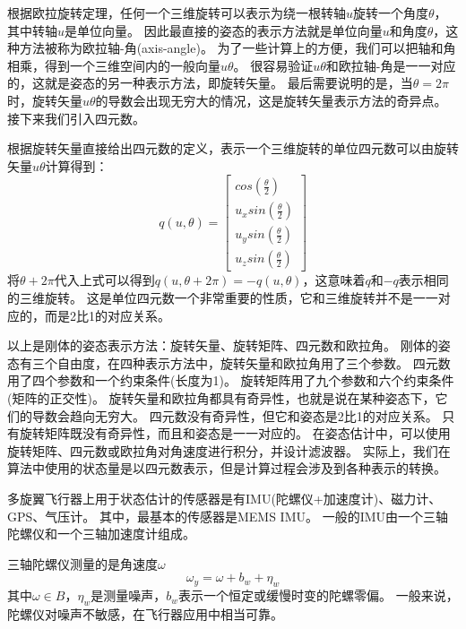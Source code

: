 \documentclass[
  type=master
]{gdutthesis}
\begin{document}
根据欧拉旋转定理，任何一个三维旋转可以表示为绕一根转轴$u$旋转一个角度$\theta$，其中转轴$u$是单位向量\cite{palais2007euler}。
因此最直接的姿态的表示方法就是单位向量$u$和角度$\theta$，这种方法被称为欧拉轴-角(axis-angle)。
为了一些计算上的方便，我们可以把轴和角相乘，得到一个三维空间内的一般向量$u\theta$。
很容易验证$u\theta$和欧拉轴-角是一一对应的，这就是姿态的另一种表示方法，即旋转矢量。
最后需要说明的是，当$\theta = 2\pi$时，旋转矢量$u\theta$的导数会出现无穷大的情况，这是旋转矢量表示方法的奇异点。
接下来我们引入四元数。

根据旋转矢量直接给出四元数的定义，表示一个三维旋转的单位四元数可以由旋转矢量$u\theta$计算得到：
\begin{equation}
	q(u,\theta) = 
	\begin{bmatrix}
		cos(\frac{\theta}{2}) \\
		u_x sin(\frac{\theta}{2}) \\
		u_y sin(\frac{\theta}{2}) \\
		u_z sin(\frac{\theta}{2})
	\end{bmatrix}	
\end{equation}
将$\theta + 2\pi$代入上式可以得到$q(u,\theta + 2\pi)=-q(u,\theta)$，这意味着$q$和$-q$表示相同的三维旋转。
这是单位四元数一个非常重要的性质，它和三维旋转并不是一一对应的，而是2比1的对应关系。

以上是刚体的姿态表示方法：旋转矢量、旋转矩阵、四元数和欧拉角。
刚体的姿态有三个自由度，在四种表示方法中，旋转矢量和欧拉角用了三个参数。
四元数用了四个参数和一个约束条件(长度为1)。
旋转矩阵用了九个参数和六个约束条件(矩阵的正交性)。
旋转矢量和欧拉角都具有奇异性，也就是说在某种姿态下，它们的导数会趋向无穷大。
四元数没有奇异性，但它和姿态是2比1的对应关系。
只有旋转矩阵既没有奇异性，而且和姿态是一一对应的。
在姿态估计中，可以使用旋转矩阵、四元数或欧拉角对角速度进行积分，并设计滤波器。
实际上，我们在算法中使用的状态量是以四元数表示，但是计算过程会涉及到各种表示的转换。

多旋翼飞行器上用于状态估计的传感器是有IMU(陀螺仪+加速度计)、磁力计、GPS、气压计。
其中，最基本的传感器是MEMS IMU。
一般的IMU由一个三轴陀螺仪和一个三轴加速度计组成。

三轴陀螺仪测量的是角速度$\omega$
\begin{equation}\label{eq:gyromodel}
	\omega_y=\omega+b_w+\eta_w
\end{equation}
其中$\omega \in B$，$\eta_w$是测量噪声，$b_w$表示一个恒定或缓慢时变的陀螺零偏。
一般来说，陀螺仪对噪声不敏感，在飞行器应用中相当可靠。
\end{document}
